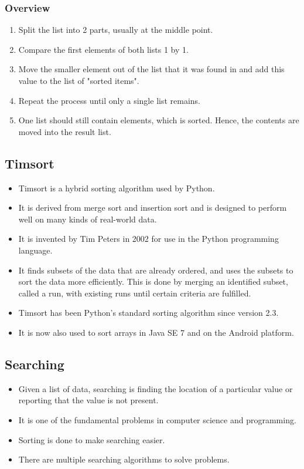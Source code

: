 \documentclass[11pt]{article}
\begin{document}
\subsubsection{Overview}
\label{sec:orgc1c1f71}
\begin{enumerate}
\item Split the list into 2 parts, usually at the middle point.
\item Compare the first elements of both lists 1 by 1.
\item Move the smaller element out of the list that it was found in and add this value to the list of "sorted items".
\item Repeat the process until only a single list remains.
\item One list should still contain elements, which is sorted. Hence, the contents are moved into the result list.
\end{enumerate}
\subsection{Timsort}
\label{sec:orgffd4dac}
\begin{itemize}
\item Timsort is a hybrid sorting algorithm used by Python.
\item It is derived from merge sort and insertion sort and is designed to perform well on many kinds of real-world data.
\item It is invented by Tim Peters in 2002 for use in the Python programming language.
\item It finds subsets of the data that are already ordered, and uses the subsets to sort the data more efficiently. This is done by merging an identified subset, called a run, with existing runs until certain criteria are fulfilled.
\item Timsort has been Python's standard sorting algorithm since version 2.3.
\item It is now also used to sort arrays in Java SE 7 and on the Android platform.
\end{itemize}
\subsection{Searching}
\label{sec:org5d464ee}
\begin{itemize}
\item Given a list of data, searching is finding the location of a particular value or reporting that the value is not present.
\item It is one of the fundamental problems in computer science and programming.
\item Sorting is done to make searching easier.
\item There are multiple searching algorithms to solve problems.
\end{itemize}
\end{document}
